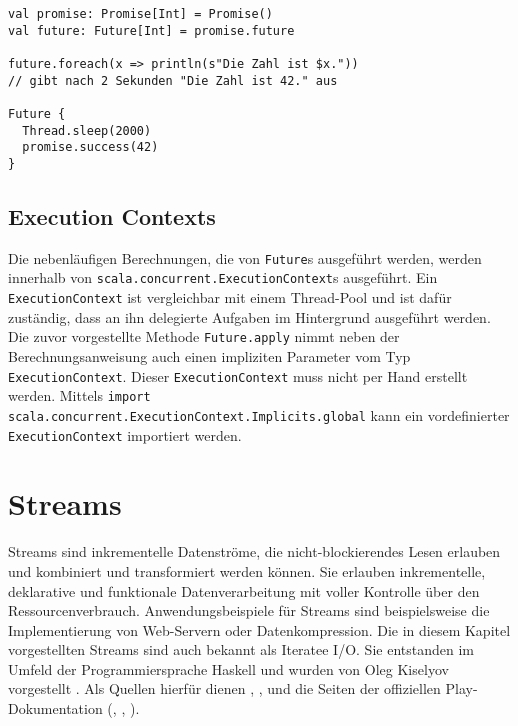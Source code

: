 \begin{lstlisting}[caption=Future-Erstellung mit einem Promise, label=lst:future_erstellung_mit_einem_promise]
val promise: Promise[Int] = Promise()
val future: Future[Int] = promise.future

future.foreach(x => println(s"Die Zahl ist $x."))
// gibt nach 2 Sekunden "Die Zahl ist 42." aus

Future {
  Thread.sleep(2000)
  promise.success(42)
}
\end{lstlisting}


\subsection{Execution Contexts} %
\label{sub:execution_contexts}

Die nebenläufigen Berechnungen, die von \lstinline|Future|s ausgeführt werden, werden innerhalb von \lstinline|scala.concurrent.ExecutionContext|s ausgeführt.
Ein \lstinline|ExecutionContext| ist vergleichbar mit einem Thread-Pool und ist dafür zuständig, dass an ihn delegierte Aufgaben im Hintergrund ausgeführt werden.
Die zuvor vorgestellte Methode \lstinline|Future.apply| nimmt neben der Berechnungsanweisung auch einen impliziten Parameter vom Typ \lstinline|ExecutionContext|.
Dieser \lstinline|ExecutionContext| muss nicht per Hand erstellt werden.
Mittels \lstinline|import scala.concurrent.ExecutionContext.Implicits.global| kann ein vordefinierter \lstinline|ExecutionContext| importiert werden.




\section{Streams} %
\label{sec:streams}

Streams sind inkrementelle Datenströme, die nicht-blockierendes Lesen erlauben und kombiniert und transformiert werden können.
Sie erlauben inkrementelle, deklarative und funktionale Datenverarbeitung mit voller Kontrolle über den Ressourcenverbrauch.
Anwendungsbeispiele für Streams sind beispielsweise die Implementierung von Web-Servern oder Datenkompression.
Die in diesem Kapitel vorgestellten Streams sind auch bekannt als Iteratee I/O.
Sie entstanden im Umfeld der Programmiersprache Haskell und wurden von Oleg Kiselyov vorgestellt \cite[vgl.][S.~19]{monad_reader}.
Als Quellen hierfür dienen \citealt{kiselyov2012}, \citealt{iteratee_io}, \citealt{monad_reader} und die Seiten der offiziellen Play-Dokumentation (\citealt{iteratees}, \cite{enumerators}, \cite{play_api_documentation}).


